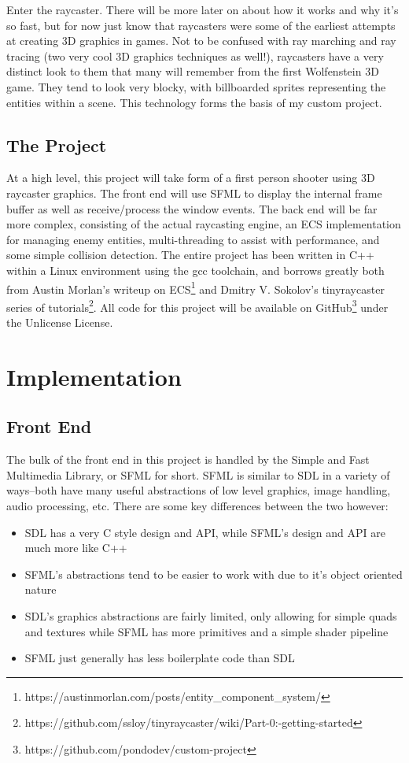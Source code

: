 \documentclass{article}
\begin{document}
Enter the raycaster. There will be more later on about how it works and why it's
so fast, but for now just know that raycasters were some of the earliest
attempts at creating 3D graphics in games. Not to be confused with ray marching
and ray tracing (two very cool 3D graphics techniques as well!), raycasters have
a very distinct look to them that many will remember from the first Wolfenstein
3D game. They tend to look very blocky, with billboarded sprites representing
the entities within a scene. This technology forms the basis of my custom
project.

\subsection{The Project}
At a high level, this project will take form of a first person shooter using
3D raycaster graphics. The front end will use SFML to display the internal frame
buffer as well as receive/process the window events. The back end will be far
more complex, consisting of the actual raycasting engine, an ECS implementation
for managing enemy entities, multi-threading to assist with performance, and
some simple collision detection. The entire project has been written in C++
within a Linux environment using the gcc toolchain, and borrows greatly both
from Austin Morlan's writeup on ECS\footnote{https://austinmorlan.com/posts/entity\_component\_system/}
and Dmitry V. Sokolov's tinyraycaster series of tutorials\footnote{https://github.com/ssloy/tinyraycaster/wiki/Part-0:-getting-started}.
All code for this project will be available on GitHub\footnote{https://github.com/pondodev/custom-project}
under the Unlicense License.

\section{Implementation}

\subsection{Front End}
The bulk of the front end in this project is handled by the Simple and Fast
Multimedia Library, or SFML for short. SFML is similar to SDL in a variety of
ways--both have many useful abstractions of low level graphics, image handling,
audio processing, etc. There are some key differences between the two however:

\begin{itemize}
    \item SDL has a very C style design and API, while SFML's design and API are
          much more like C++
    \item SFML's abstractions tend to be easier to work with due to it's object
          oriented nature
    \item SDL's graphics abstractions are fairly limited, only allowing for
          simple quads and textures while SFML has more primitives and a simple
          shader pipeline
    \item SFML just generally has less boilerplate code than SDL
\end{itemize}
\end{document}
